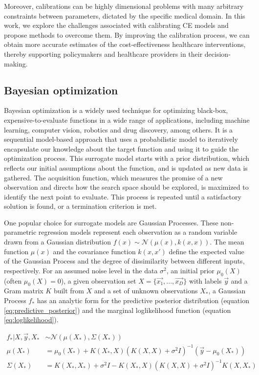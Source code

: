 \documentclass{IOS-Book-Article}
\begin{document}
	Moreover, calibrations can be highly dimensional problems with many arbitrary constraints between parameters, dictated by the specific medical domain. In this work, we explore the challenges associated with calibrating CE models and propose methods to overcome them. By improving the calibration process, we can obtain more accurate estimates of the cost-effectiveness healthcare interventions, thereby supporting policymakers and healthcare providers in their decision-making.
	
	\subsection{Bayesian optimization}
	Bayesian optimization is a widely used technique for optimizing black-box, expensive-to-evaluate functions\cite{bayesian-opt} in a wide range of applications, including machine learning, computer vision, robotics and drug discovery, among others. It is a sequential model-based approach that uses a probabilistic model to iteratively encapsulate our knowledge about the target function and using it to guide the optimization process. This surrogate model starts with a prior distribution, which reflects our initial assumptions about the function, and is updated as new data is gathered. The acquisition function, which measures the promise of a new observation and directs how the search space should be explored, is maximized to identify the next point to evaluate. This process is repeated until a satisfactory solution is found, or a termination criterion is met.
	
	One popular choice for surrogate models are Gaussian Processes\cite{gaussian-processes}. These non-parametric regression models represent each observation as a random variable drawn from a Gaussian distribution $f(x) \sim \mathcal{N}(\mu(x), k(x,x))$. The mean function $\mu(x)$ and the covariance function $k(x,x')$ define the expected value of the Gaussian Process and the degree of dissimilarity between different inputs, respectively. For an assumed noise level in the data $\sigma^2$, an initial prior $\mu_0(X)$ (often $\mu_0(X)=0$), a given observation set $X=\{\vec{x_1}, ..., \vec{x_D}\}$ with labels $\vec{y}$ and a Gram matrix $K$ built from $X$ and a set of unknown observations $X_*$, a Gaussian Process $f_*$ has an analytic form for the predictive posterior distribution (equation \ref{eq:predictive_posterior}) and the marginal loglikelihood function (equation \ref{eq:loglikelihood}).
	
	\begin{equation} \label{eq:predictive_posterior}
		\begin{aligned}
			f_*|X,\vec{y},X_* & \sim \mathcal{N}(\mu(X_*), \Sigma(X_*)) \\
			\mu(X_*) & = \mu_0(X_*) + K(X_*,X)(K(X,X) + \sigma^2 I)^{-1}(\vec{y} - \mu_0(X_*)) \\
			\Sigma(X_*) & = K(X_*,X_*) + \sigma^2 I - K(X_*,X)(K(X,X) + \sigma^2 I)^{-1} K(X,X_*)
		\end{aligned}
	\end{equation}
	
\end{document}
